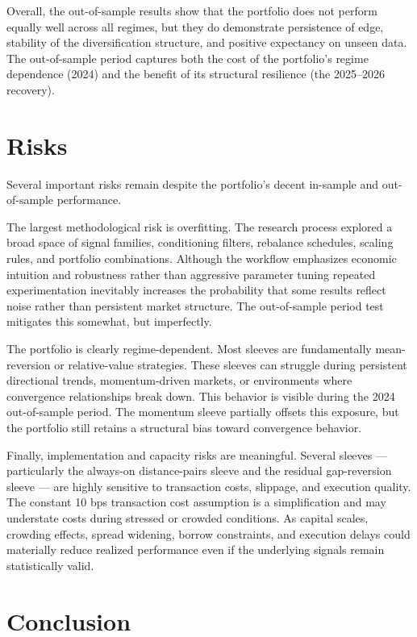 \documentclass{article}
\begin{document}
Overall, the out-of-sample results show that the portfolio does not perform equally well across all regimes, but they do demonstrate persistence of edge, stability of the diversification structure, and positive expectancy on unseen data. The out-of-sample period captures both the cost of the portfolio’s regime dependence (2024) and the benefit of its structural resilience (the 2025–2026 recovery).


\section{Risks}

Several important risks remain despite the portfolio’s decent in-sample and out-of-sample performance.

The largest methodological risk is overfitting. The research process explored a broad space of signal families, conditioning filters, rebalance schedules, scaling rules, and portfolio combinations. Although the workflow emphasizes economic intuition and robustness rather than aggressive parameter tuning repeated experimentation inevitably increases the probability that some results reflect noise rather than persistent market structure. The out-of-sample period test mitigates this somewhat, but imperfectly.

The portfolio is clearly regime-dependent. Most sleeves are fundamentally mean-reversion or relative-value strategies. These sleeves can struggle during persistent directional trends, momentum-driven markets, or environments where convergence relationships break down. This behavior is visible during the 2024 out-of-sample period. The momentum sleeve partially offsets this exposure, but the portfolio still retains a structural bias toward convergence behavior.

Finally, implementation and capacity risks are meaningful. Several sleeves — particularly the always-on distance-pairs sleeve and the residual gap-reversion sleeve — are highly sensitive to transaction costs, slippage, and execution quality. The constant 10 bps transaction cost assumption is a simplification and may understate costs during stressed or crowded conditions. As capital scales, crowding effects, spread widening, borrow constraints, and execution delays could materially reduce realized performance even if the underlying signals remain statistically valid.

\section{Conclusion}
\end{document}
